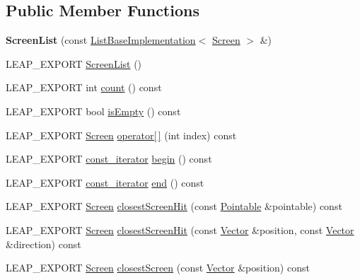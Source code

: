\subsection*{Public Member Functions}
\begin{DoxyCompactItemize}
\item 
\hypertarget{class_leap_1_1_screen_list_a7ce73ebf3b8f5d85f456417a3fd5227c}{{\bfseries Screen\+List} (const \hyperlink{class_leap_1_1_list_base_implementation}{List\+Base\+Implementation}$<$ \hyperlink{class_leap_1_1_screen}{Screen} $>$ \&)}\label{class_leap_1_1_screen_list_a7ce73ebf3b8f5d85f456417a3fd5227c}

\item 
L\+E\+A\+P\+\_\+\+E\+X\+P\+O\+R\+T \hyperlink{class_leap_1_1_screen_list_ac105715f15a022ea47767c548722812d}{Screen\+List} ()
\item 
L\+E\+A\+P\+\_\+\+E\+X\+P\+O\+R\+T int \hyperlink{class_leap_1_1_screen_list_a1c290cc967c6158f15f2ad3fa15a44e9}{count} () const 
\item 
L\+E\+A\+P\+\_\+\+E\+X\+P\+O\+R\+T bool \hyperlink{class_leap_1_1_screen_list_a589cfc780096be2e41b3e9576ac9cd9c}{is\+Empty} () const 
\item 
L\+E\+A\+P\+\_\+\+E\+X\+P\+O\+R\+T \hyperlink{class_leap_1_1_screen}{Screen} \hyperlink{class_leap_1_1_screen_list_aa20953716738fcdb48d457b0a9bfe308}{operator\mbox{[}$\,$\mbox{]}} (int index) const 
\item 
L\+E\+A\+P\+\_\+\+E\+X\+P\+O\+R\+T \hyperlink{class_leap_1_1_screen_list_aa5375d780cb454e661f94096dcefd431}{const\+\_\+iterator} \hyperlink{class_leap_1_1_screen_list_acfff13c200a11512118532f40e187248}{begin} () const 
\item 
L\+E\+A\+P\+\_\+\+E\+X\+P\+O\+R\+T \hyperlink{class_leap_1_1_screen_list_aa5375d780cb454e661f94096dcefd431}{const\+\_\+iterator} \hyperlink{class_leap_1_1_screen_list_a6cebbd92a467aec867535e5ec5f98de1}{end} () const 
\item 
L\+E\+A\+P\+\_\+\+E\+X\+P\+O\+R\+T \hyperlink{class_leap_1_1_screen}{Screen} \hyperlink{class_leap_1_1_screen_list_a3bee50c85325a4935fd6be400a943338}{closest\+Screen\+Hit} (const \hyperlink{class_leap_1_1_pointable}{Pointable} \&pointable) const 
\item 
L\+E\+A\+P\+\_\+\+E\+X\+P\+O\+R\+T \hyperlink{class_leap_1_1_screen}{Screen} \hyperlink{class_leap_1_1_screen_list_aa96701f5c1394f2a386db5e719ca2553}{closest\+Screen\+Hit} (const \hyperlink{struct_leap_1_1_vector}{Vector} \&position, const \hyperlink{struct_leap_1_1_vector}{Vector} \&direction) const 
\item 
L\+E\+A\+P\+\_\+\+E\+X\+P\+O\+R\+T \hyperlink{class_leap_1_1_screen}{Screen} \hyperlink{class_leap_1_1_screen_list_ad5d7a0cc4ddba08e7fcf5d54bfe94255}{closest\+Screen} (const \hyperlink{struct_leap_1_1_vector}{Vector} \&position) const 
\end{DoxyCompactItemize}

